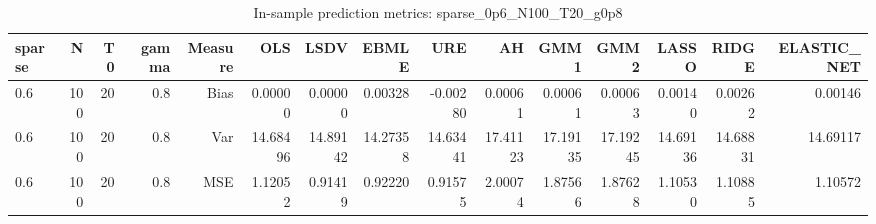 \begin{table}[!htbp]\centering
\caption{In-sample prediction metrics: sparse_0p6_N100_T20_g0p8}
\label{tab:table2_sparse_0p6_N100_T20_g0p8}
\begin{tabular}{lrrrrrrrrrrrrrr}
\hline
sparse & N & T0 & gamma & Measure & OLS & LSDV & EBMLE & URE & AH & GMM1 & GMM2 & LASSO & RIDGE & ELASTIC_NET \\
\hline
0.6 & 100 & 20 & 0.8 & Bias & 0.00000 & 0.00000 & 0.00328 & -0.00280 & 0.00061 & 0.00061 & 0.00063 & 0.00140 & 0.00262 & 0.00146 \\
0.6 & 100 & 20 & 0.8 & Var & 14.68496 & 14.89142 & 14.27358 & 14.63441 & 17.41123 & 17.19135 & 17.19245 & 14.69136 & 14.68831 & 14.69117 \\
0.6 & 100 & 20 & 0.8 & MSE & 1.12052 & 0.91419 & 0.92220 & 0.91575 & 2.00074 & 1.87566 & 1.87628 & 1.10530 & 1.10885 & 1.10572 \\
\hline
\end{tabular}
\end{table}

